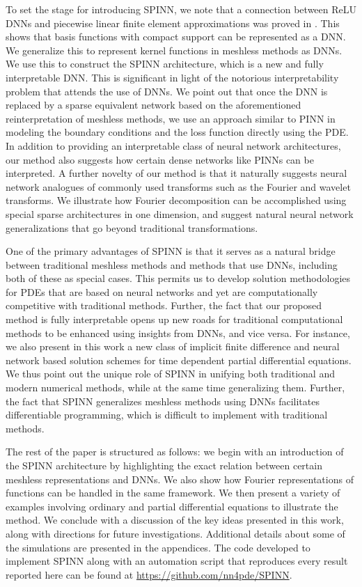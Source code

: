 \documentclass[12pt]{article}
\begin{document}
To set the stage for introducing SPINN, we note that a connection between ReLU DNNs and piecewise linear finite element approximations was proved in \cite{HLXZ2020}. This shows that basis functions with compact support can be represented as a DNN. We generalize this to represent kernel functions in meshless methods as DNNs. We use this to construct the SPINN architecture, which is a new and fully interpretable DNN. This is significant in light of the notorious interpretability problem that attends the use of DNNs. We point out that once the DNN is replaced by a sparse equivalent network based on the aforementioned reinterpretation of meshless methods, we use an approach similar to PINN in modeling the boundary conditions and the loss function directly using the PDE. In addition to providing an interpretable class of neural network architectures, our method also suggests how certain dense networks like PINNs can be interpreted. A further novelty of our method is that it naturally suggests neural network analogues of commonly used transforms such as the Fourier and wavelet transforms. We illustrate how Fourier decomposition can be accomplished using special sparse architectures in one dimension, and suggest natural neural network generalizations that go beyond traditional transformations.

One of the primary advantages of SPINN is that it serves as a natural bridge between traditional meshless methods and methods that use DNNs, including both of these as special cases. This permits us to develop solution methodologies for PDEs that are based on neural networks and yet are computationally competitive with traditional methods. Further, the fact that our proposed method is fully interpretable opens up new roads for traditional computational methods to be enhanced using insights from DNNs, and vice versa. For instance, we also present in this work a new class of implicit finite difference and neural network based solution schemes for time dependent partial differential equations. We thus point out the unique role of SPINN in unifying both traditional and modern numerical methods, while at the same time generalizing them. Further, the fact that SPINN generalizes meshless methods using DNNs facilitates differentiable programming, which is difficult to implement with traditional methods.

The rest of the paper is structured as follows: we begin with an introduction of the SPINN architecture by highlighting the exact relation between certain meshless representations and DNNs. We also show how Fourier representations of functions can be handled in the same framework. We then present a variety of examples involving ordinary and partial differential equations to illustrate the method. We conclude with a discussion of the key ideas presented in this work, along with directions for future investigations. Additional details about some of the simulations are presented in the appendices. The code developed to implement SPINN along with an automation script that reproduces every result reported here can be found at \url{https://github.com/nn4pde/SPINN}.
\end{document}
